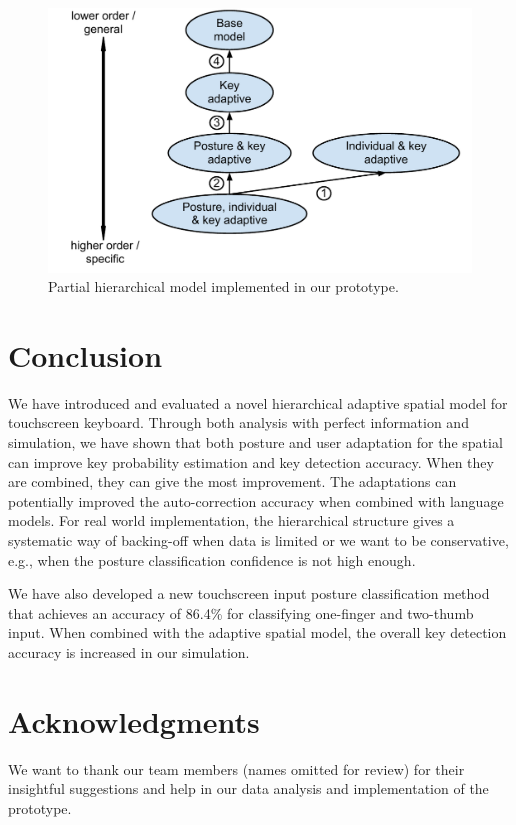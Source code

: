 \documentclass{sigchi}
\begin{document}
\begin{figure}
  \centering
  \includegraphics[width=0.9\columnwidth]{figures/partial-hierarchy.pdf}
  \caption{Partial hierarchical model implemented in our prototype.}
  \label{fig:partial-hierarchy}
\end{figure}

\section{Conclusion}
We have introduced and evaluated a novel hierarchical adaptive spatial model for
touchscreen keyboard. Through both analysis with perfect information and simulation,
we have shown that both posture and user adaptation for the spatial can improve
key probability estimation and key detection accuracy. When they are combined, they can
give the most improvement. The adaptations can potentially
improved the auto-correction accuracy when combined with language models. For real world
implementation, the
hierarchical structure gives a systematic way of backing-off  when data is limited
or we want to be conservative, e.g., when the posture classification confidence is not 
high enough. 

We have also developed a new touchscreen input posture classification method
that achieves an accuracy of 86.4\% for classifying one-finger and two-thumb input. When
combined with the adaptive spatial model, the overall key detection accuracy is increased
in our simulation.

\section{Acknowledgments}
We want to thank our team members (names omitted for review) for their insightful
suggestions and help in  our data analysis and implementation of the prototype. 

\balance

\small


\end{document}
